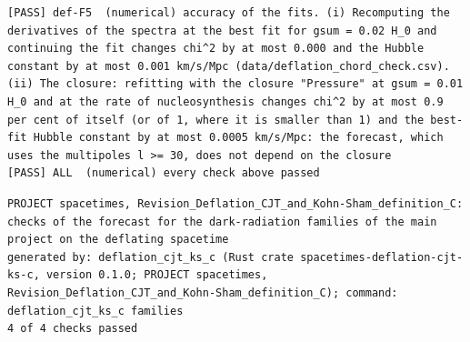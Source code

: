 \documentclass[
  10pt,
]{article}
\begin{document}
\begin{verbatim}
[PASS] def-F5  (numerical) accuracy of the fits. (i) Recomputing the derivatives of the spectra at the best fit for gsum = 0.02 H_0 and continuing the fit changes chi^2 by at most 0.000 and the Hubble constant by at most 0.001 km/s/Mpc (data/deflation_chord_check.csv). (ii) The closure: refitting with the closure "Pressure" at gsum = 0.01 H_0 and at the rate of nucleosynthesis changes chi^2 by at most 0.9 per cent of itself (or of 1, where it is smaller than 1) and the best-fit Hubble constant by at most 0.0005 km/s/Mpc: the forecast, which uses the multipoles l >= 30, does not depend on the closure
[PASS] ALL  (numerical) every check above passed
\end{verbatim}

\begin{verbatim}
PROJECT spacetimes, Revision_Deflation_CJT_and_Kohn-Sham_definition_C: checks of the forecast for the dark-radiation families of the main project on the deflating spacetime
generated by: deflation_cjt_ks_c (Rust crate spacetimes-deflation-cjt-ks-c, version 0.1.0; PROJECT spacetimes, Revision_Deflation_CJT_and_Kohn-Sham_definition_C); command: deflation_cjt_ks_c families
4 of 4 checks passed


\end{verbatim}
\end{document}
